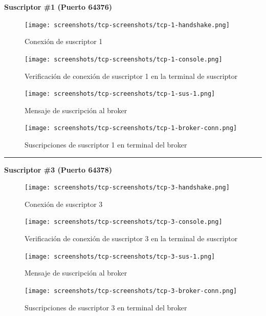 \documentclass[10pt]{article}
\begin{document}
\textbf{Suscriptor \#1 (Puerto 64376)}

\begin{figure}[H]
    \centering
    \texttt{[image: screenshots/tcp-screenshots/tcp-1-handshake.png]}
    \caption{Conexión de suscriptor 1}
\end{figure}

\begin{figure}[H]
    \centering
    \texttt{[image: screenshots/tcp-screenshots/tcp-1-console.png]}
    \caption{Verificación de conexión de suscriptor 1 en la terminal de suscriptor}
\end{figure}


\begin{figure}[H]
    \centering
    \texttt{[image: screenshots/tcp-screenshots/tcp-1-sus-1.png]}
    \caption{Mensaje de suscripción al broker}
\end{figure}

\begin{figure}[H]
    \centering
    \texttt{[image: screenshots/tcp-screenshots/tcp-1-broker-conn.png]}
    \caption{Suscripciones de suscriptor 1 en terminal del broker}
\end{figure}    

\newpage
\vspace{1mm} %
\noindent\rule{\linewidth}{0.4pt} %
\vspace{1mm} %

\textbf{Suscriptor \#3 (Puerto 64378)}

\begin{figure}[H]
    \centering
    \texttt{[image: screenshots/tcp-screenshots/tcp-3-handshake.png]}
    \caption{Conexión de suscriptor 3}
\end{figure}

\begin{figure}[H]
    \centering
    \texttt{[image: screenshots/tcp-screenshots/tcp-3-console.png]}
    \caption{Verificación de conexión de suscriptor 3 en la terminal de suscriptor}
\end{figure}


\begin{figure}[H]
    \centering
    \texttt{[image: screenshots/tcp-screenshots/tcp-3-sus-1.png]}
    \caption{Mensaje de suscripción al broker}
\end{figure}

\begin{figure}[H]
    \centering
    \texttt{[image: screenshots/tcp-screenshots/tcp-3-broker-conn.png]}
    \caption{Suscripciones de suscriptor 3 en terminal del broker}
\end{figure}    
\end{document}
